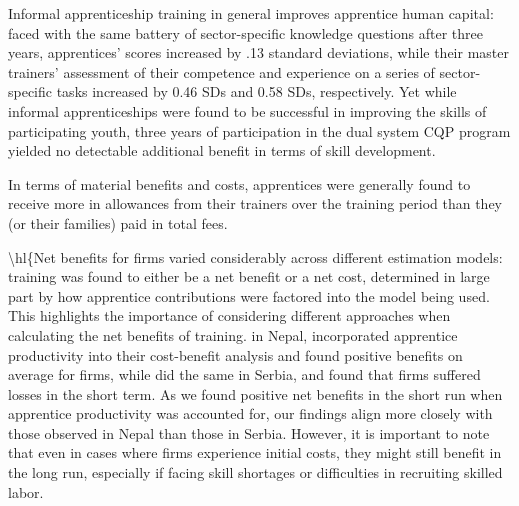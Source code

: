 \documentclass[
  a4paper, twoside, 12pt]{book}
\renewcommand{\hl}[1]{#1}
\newcommand{\hlc}[2][color]{}
\begin{document}
Informal apprenticeship training in general improves apprentice human capital: faced with the same battery of sector-specific knowledge questions after three years, apprentices' scores increased by .13 standard deviations, while their master trainers' assessment of their competence and experience on a series of sector-specific tasks increased by 0.46 SDs and 0.58 SDs, respectively. \hl{Yet while informal apprenticeships were found to be successful in improving the skills of participating youth, three years of participation in the dual system CQP program yielded no detectable additional benefit in terms of skill development.}

\hl{In terms of material benefits and costs, apprentices were generally found to receive more in allowances from their trainers over the training period than they (or their families) paid in total fees.} \hlc[lightgray]{While informal apprentices in Bénin generally receive no formal wages, small, irregular allowances disbursed to youth for small expenses nevertheless contribute significantly to total firm expenditures: 89 percent of apprentices received more in allowances than they pay in fees when apprenticeships are assumed to last four years. The average apprentice received 437 \$US more per year in allowances than he or she payed in fees, assuming a four year apprenticeship --- a significant proportion of total firm revenues. Considering that the average firm reported training 6 apprentices (or 68.4 percent of all workers in the firm), apprentices would appear repay their firms through substantial productive contributions, rather than fees. This suggests a model of informal apprenticeship that diverges from previous models, which emphasize the role of fees exchanged for specific human capital rather than productive contributions exchanged for allowances.}

\textbackslash hl\{Net benefits for firms varied considerably across different estimation models: training was found to either be a net benefit or a net cost, determined in large part by how apprentice contributions were factored into the model being used. This highlights the importance of considering different approaches when calculating the net benefits of training. \textcite{bolli2020} \hl{in Nepal, incorporated apprentice productivity into their cost-benefit analysis and found positive benefits on average for firms, while} \textcite{bolli2021} \hl{did the same in Serbia, and found that firms suffered losses in the short term. As we found positive net benefits in the short run when apprentice productivity was accounted for, our findings align more closely with those observed in Nepal than those in Serbia. However, it is important to note that even in cases where firms experience initial costs, they might still benefit in the long run, especially if facing skill shortages or difficulties in recruiting skilled labor.}
\end{document}
